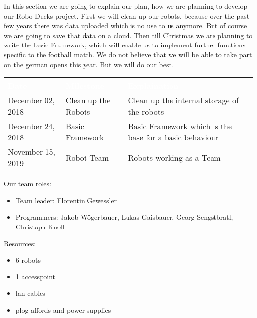 \documentclass[12pt]{article}
\theoremstyle{definition}
\begin{document}
In this section we are going to explain our plan, how we are planning to develop our Robo Ducks project. First we will clean up our robots, because over the past few years there was data uploaded which is no use to us anymore. But of course we are going to save that data on a cloud. 
Then till Christmas we are planning to write the basic Framework, which will enable us to implement further functions specific to the football match. We do not believe that we will be able to take part on the german opens this year. But we will do our best. \newline
\begin{flushleft}
\begin{tabular}{|l|l|p{.5\linewidth}|}
\hline
\cellcolor[gray]{0.5}\textcolor{white}{Date} & \cellcolor[gray]{0.5}\textcolor{white}{Milestone} & \cellcolor[gray]{0.5}\textcolor{white}{Explaination} \\ \hline
December 02, 2018&Clean up the Robots&Clean up the internal storage of the robots \\ \hline
December 24, 2018&Basic Framework&Basic Framework which is the base for a basic behaviour\\ \hline
November 15, 2019&Robot Team&Robots working as a Team\\ \hline



\end{tabular}
\end{flushleft}

Our team roles:
\begin{itemize}
\item Team leader:	Florentin Gewessler
\item Programmers:	Jakob Wögerbauer, Lukas Gaisbauer, Georg Sengstbratl, Christoph Knoll
\end{itemize}





Resources:

\begin{itemize}
\item 6 robots
\item 1 accesspoint
\item lan cables
\item plog affords and power supplies
\end{itemize}
\pagebreak
\end{document}
